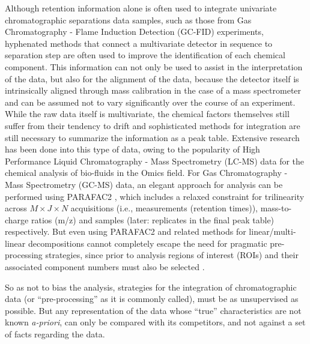 \documentclass[preprint,12pt]{elsarticle}
\begin{document}
Although retention information alone is often used to integrate univariate chromatographic separations data samples, such as those from Gas Chromatography - Flame Induction Detection (GC-FID) experiments, hyphenated methods that connect a multivariate detector in sequence to separation step are often used to improve the identification of each chemical component. This information can not only be used to assist in the interpretation of the data, but also for the alignment of the data, because the detector itself is intrinsically aligned through mass calibration in the case of a mass spectrometer and can be assumed not to vary significantly over the course of an experiment. While the raw data itself is multivariate, the chemical factors themselves still suffer from their tendency to drift and sophisticated methods for integration are still necessary to summarize the information as a peak table. Extensive research has been done into this type of data, owing to the popularity of High Performance Liquid Chromatography - Mass Spectrometry (LC-MS) data for the chemical analysis of bio-fluids in the Omics field. For Gas Chromatography - Mass Spectrometry (GC-MS) data, an elegant approach for analysis can be performed using PARAFAC2 \cite{kiers1999parafac2}, which includes a relaxed constraint for trilinearity across $M \times J \times N$ acquisitions (i.e., measurements (retention times)), mass-to-charge ratios (m/z) and samples (later: replicates in the final peak table) respectively. But even using PARAFAC2 and related methods for linear/multi-linear decompositions cannot completely escape the need for pragmatic pre-processing strategies, since prior to analysis regions of interest (ROIs) and their associated component numbers must also be selected \cite{baccolo2021untargeted,giebelhaus2022untargeted}.

So as not to bias the analysis, strategies for the integration of chromatographic data (or ``pre-processing'' as it is commonly called), must be as unsupervised as possible. But any representation of the data whose ``true'' characteristics are not known \textit{a-priori}, can only be compared with its competitors, and not against a set of facts regarding the data\cite{weggler2021unique}.


\end{document}
